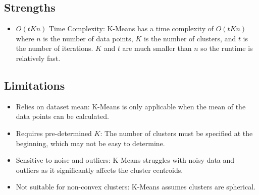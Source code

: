\documentclass{article}
\begin{document}
\subsection*{Strengths}

\begin{itemize}
    \item $O(tKn)$ Time Complexity: K-Means has a time complexity of $O(tKn)$ where $n$ is the number of data points, $K$ is the number of clusters, and $t$ is the number of iterations. $K$ and $t$ are much smaller than $n$ so the runtime is relatively fast.
\end{itemize}

\subsection*{Limitations}

\begin{itemize}
    \item Relies on dataset mean: K-Means is only applicable when the mean of the data points can be calculated.
    \item Requires pre-determined $K$: The number of clusters must be specified at the beginning, which may not be easy to determine.
    \item Sensitive to noise and outliers: K-Means struggles with noisy data and outliers as it significantly affects the cluster centroids.
    \item Not suitable for non-convex clusters: K-Means assumes clusters are spherical.
\end{itemize}
\end{document}
